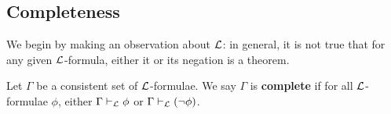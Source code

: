 \subsection{Completeness}

We begin by making an observation about $\mathcal{L}$: in general, it is not true that for any given $\mathcal{L}$-formula, either it or its negation is a theorem.

\begin{boxdefinition}[Completeness]
    Let $\Gamma$ be a consistent set of $\mathcal{L}$-formulae. We say $\Gamma$ is \textbf{complete} if for all $\mathcal{L}$-formulae $\phi$, either $\Gamma \vdash_{\mathcal{L}} \phi$ or $\Gamma \vdash_{\mathcal{L}} \left( \neg \phi \right)$.
\end{boxdefinition}


